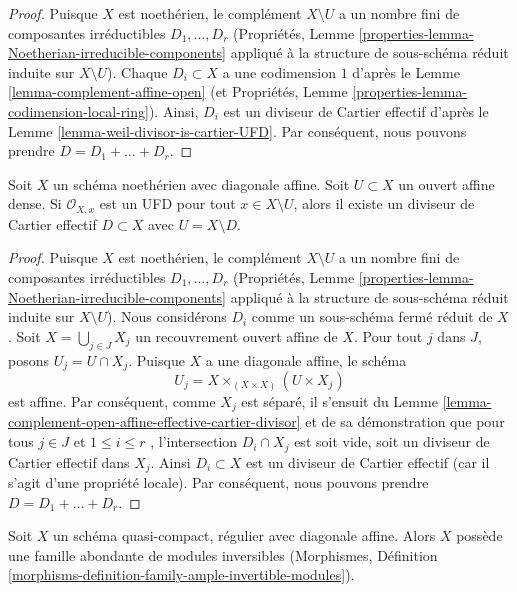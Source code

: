 \begin{proof}
Puisque  $X$  est noethérien, le complément  $X \setminus U$  a un nombre fini
de composantes irréductibles  $D_1, \ldots, D_r$  (Propriétés, Lemme  \ref{properties-lemma-Noetherian-irreducible-components}  appliqué
à la structure de sous-schéma réduit induite sur  $X \setminus U$). Chaque
 $D_i \subset X$  a une codimension  $1$  d'après le Lemme  \ref{lemma-complement-affine-open}  (et
Propriétés, Lemme  \ref{properties-lemma-codimension-local-ring}). Ainsi,  $D_i$  est un diviseur de Cartier
effectif d'après le Lemme  \ref{lemma-weil-divisor-is-cartier-UFD}. Par conséquent, nous pouvons prendre
 $D = D_1 + \ldots + D_r$.
\end{proof}

\begin{lemma}
\label{lemma-complement-open-affine-effective-cartier-divisor-bis}
Soit  $X$  un schéma noethérien avec diagonale affine. Soit  $U \subset X$  un
ouvert affine dense. Si  $\mathcal{O}_{X, x}$  est un UFD pour tout  $x \in X \setminus U$, alors il
existe un diviseur de Cartier effectif  $D \subset X$  avec  $U = X \setminus D$.
\end{lemma}

\begin{proof}
Puisque  $X$  est noethérien, le complément  $X \setminus U$  a un nombre fini
de composantes irréductibles  $D_1, \ldots, D_r$  (Propriétés, Lemme  \ref{properties-lemma-Noetherian-irreducible-components}  appliqué
à la structure de sous-schéma réduit induite sur  $X \setminus U$). Nous considérons
 $D_i$  comme un sous-schéma fermé réduit de  $X$. Soit  $X = \bigcup_{j \in J} X_j$ 
un recouvrement ouvert affine de  $X$. Pour tout  $j$  dans
 $J$, posons  $U_j = U \cap X_j$. Puisque  $X$  a une diagonale affine, le
schéma
$$
U_j = X \times_{(X \times X)} (U \times X_j)
$$
est affine. Par conséquent, comme  $X_j$  est séparé, il s'ensuit du Lemme
 \ref{lemma-complement-open-affine-effective-cartier-divisor}  et de sa démonstration que pour tous  $j \in J$  et  $1 \leq i \leq r$ ,
l'intersection  $D_i \cap X_j$  est soit vide, soit un diviseur de Cartier effectif
dans  $X_j$. Ainsi  $D_i \subset X$  est un diviseur de Cartier effectif (car il
s'agit d'une propriété locale). Par conséquent, nous pouvons prendre  $D = D_1 + \ldots + D_r$.
\end{proof}

\begin{lemma}
\label{lemma-regular-ample-family}
Soit  $X$  un schéma quasi-compact, régulier avec diagonale affine. Alors
 $X$  possède une famille abondante de modules inversibles (Morphismes,
Définition  \ref{morphisms-definition-family-ample-invertible-modules}).
\end{lemma}

